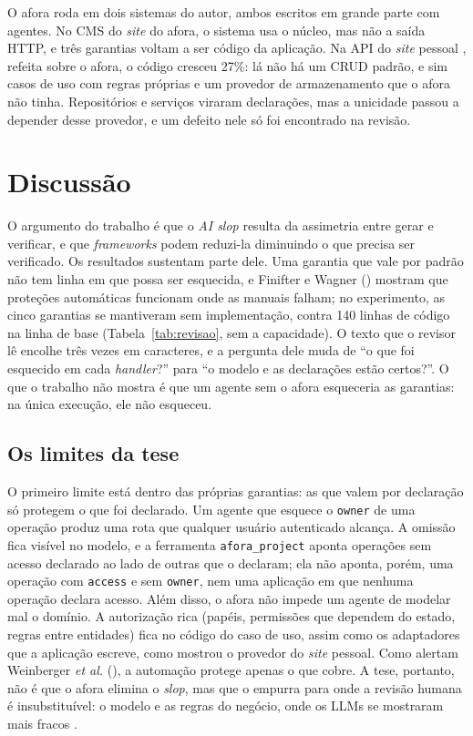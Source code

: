 \documentclass[a4paper,12pt]{article}
\providecommand{\NoCaseChange}[1]{#1} %
\DeclareRobustCommand{\etal}{\NoCaseChange{\textit{et al.}}}
\newcommand{\estr}[1]{\textit{#1}}
\begin{document}
O afora roda em dois sistemas do autor, ambos escritos em grande parte com agentes. No CMS do \estr{site} do afora, o sistema usa o núcleo, mas não a saída HTTP, e três garantias voltam a ser código da aplicação. Na API do \estr{site} pessoal \citep{anjos2026site}, refeita sobre o afora, o código cresceu 27\%: lá não há um CRUD padrão, e sim casos de uso com regras próprias e um provedor de armazenamento que o afora não tinha. Repositórios e serviços viraram declarações, mas a unicidade passou a depender desse provedor, e um defeito nele só foi encontrado na revisão.

\section{Discussão}\label{sec:discussao}

O argumento do trabalho é que o \estr{AI slop} resulta da assimetria entre gerar e verificar, e que \estr{frameworks} podem reduzi-la diminuindo o que precisa ser verificado. Os resultados sustentam parte dele. Uma garantia que vale por padrão não tem linha em que possa ser esquecida, e Finifter e Wagner (\citeyear{finifter2011}) mostram que proteções automáticas funcionam onde as manuais falham; no experimento, as cinco garantias se mantiveram sem implementação, contra 140 linhas de código na linha de base (Tabela~\ref{tab:revisao}, sem a capacidade). O texto que o revisor lê encolhe três vezes em caracteres, e a pergunta dele muda de ``o que foi esquecido em cada \estr{handler}?'' para ``o modelo e as declarações estão certos?''. O que o trabalho não mostra é que um agente sem o afora esqueceria as garantias: na única execução, ele não esqueceu.

\subsection{Os limites da tese}\label{sec:limites}

O primeiro limite está dentro das próprias garantias: as que valem por declaração só protegem o que foi declarado. Um agente que esquece o \texttt{owner} de uma operação produz uma rota que qualquer usuário autenticado alcança. A omissão fica visível no modelo, e a ferramenta \texttt{afora\_project} aponta operações sem acesso declarado ao lado de outras que o declaram; ela não aponta, porém, uma operação com \texttt{access} e sem \texttt{owner}, nem uma aplicação em que nenhuma operação declara acesso. Além disso, o afora não impede um agente de modelar mal o domínio. A autorização rica (papéis, permissões que dependem do estado, regras entre entidades) fica no código do caso de uso, assim como os adaptadores que a aplicação escreve, como mostrou o provedor do \estr{site} pessoal. Como alertam Weinberger \etal{} (\citeyear{weinberger2011}), a automação protege apenas o que cobre. A tese, portanto, não é que o afora elimina o \estr{slop}, mas que o empurra para onde a revisão humana é insubstituível: o modelo e as regras do negócio, onde os LLMs se mostraram mais fracos \citep{camara2023}.
\end{document}
